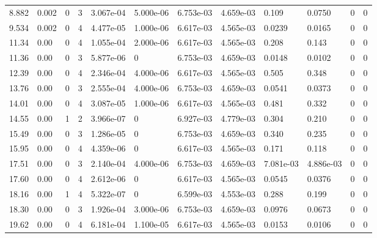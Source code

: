 \documentclass[preview]{standalone}
\begin{document}
{{\begin{tabular}{L{1.2cm}C{1.2cm} C{0.3cm}C{0.5cm} C{1.4cm}C{1.4cm} C{1.4cm}C{1.4cm} C{1.6cm}C{1.6cm} C{1.6cm}C{1.6cm}}
  8.882  &  0.002  & 0     &  3 &  3.067e-04  & 5.000e-06  &  6.753e-03&   4.659e-03& 0.109 & 0.0750   &  0 & 0  \\ 
  9.534  &  0.002  & 0     &  4 &  4.477e-05  & 1.000e-06  &  6.617e-03&   4.565e-03& 0.0239 & 0.0165   &  0 & 0  \\ 
  11.34  &  0.00  & 0     &  4 &  1.055e-04  & 2.000e-06  &  6.617e-03&   4.565e-03& 0.208 & 0.143   &  0 & 0  \\ 
  11.36  &  0.00  & 0     &  3 &  5.877e-06  & 0  &  6.753e-03&   4.659e-03& 0.0148 & 0.0102   &  0 & 0  \\ 
  12.39  &  0.00  & 0     &  4 &  2.346e-04  & 4.000e-06  &  6.617e-03&   4.565e-03& 0.505 & 0.348   &  0 & 0  \\ 
  13.76  &  0.00  & 0     &  3 &  2.555e-04  & 4.000e-06  &  6.753e-03&   4.659e-03& 0.0541 & 0.0373   &  0 & 0  \\ 
  14.01  &  0.00  & 0     &  4 &  3.087e-05  & 1.000e-06  &  6.617e-03&   4.565e-03& 0.481 & 0.332   &  0 & 0  \\ 
  14.55  &  0.00  & 1     &  2 &  3.966e-07  & 0  &  6.927e-03&   4.779e-03& 0.304 & 0.210   &  0 & 0  \\ 
  15.49  &  0.00  & 0     &  3 &  1.286e-05  & 0  &  6.753e-03&   4.659e-03& 0.340 & 0.235   &  0 & 0  \\ 
  15.95  &  0.00  & 0     &  4 &  4.359e-06  & 0  &  6.617e-03&   4.565e-03& 0.171 & 0.118   &  0 & 0  \\ 
  17.51  &  0.00  & 0     &  3 &  2.140e-04  & 4.000e-06  &  6.753e-03&   4.659e-03& 7.081e-03 & 4.886e-03   &  0 & 0  \\ 
  17.60  &  0.00  & 0     &  4 &  2.612e-06  & 0  &  6.617e-03&   4.565e-03& 0.0545 & 0.0376   &  0 & 0  \\ 
  18.16  &  0.00  & 1     &  4 &  5.322e-07  & 0  &  6.599e-03&   4.553e-03& 0.288 & 0.199   &  0 & 0  \\ 
  18.30  &  0.00  & 0     &  3 &  1.926e-04  & 3.000e-06  &  6.753e-03&   4.659e-03& 0.0976 & 0.0673   &  0 & 0  \\ 
  19.62  &  0.00  & 0     &  4 &  6.181e-04  & 1.100e-05  &  6.617e-03&   4.565e-03& 0.0153 & 0.0106   &  0 & 0  \\ 
\hline 
\end{tabular} 

}}
\end{document}
